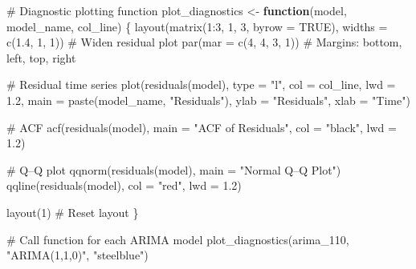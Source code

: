\documentclass[
  11pt,
]{article}
\newenvironment{Shaded}{\begin{snugshade}}{\end{snugshade}}
\newcommand{\AttributeTok}[1]{\textcolor[rgb]{0.40,0.45,0.13}{#1}}
\newcommand{\CommentTok}[1]{\textcolor[rgb]{0.37,0.37,0.37}{#1}}
\newcommand{\ConstantTok}[1]{\textcolor[rgb]{0.56,0.35,0.01}{#1}}
\newcommand{\ControlFlowTok}[1]{\textcolor[rgb]{0.00,0.23,0.31}{\textbf{#1}}}
\newcommand{\DecValTok}[1]{\textcolor[rgb]{0.68,0.00,0.00}{#1}}
\newcommand{\FloatTok}[1]{\textcolor[rgb]{0.68,0.00,0.00}{#1}}
\newcommand{\FunctionTok}[1]{\textcolor[rgb]{0.28,0.35,0.67}{#1}}
\newcommand{\NormalTok}[1]{\textcolor[rgb]{0.00,0.23,0.31}{#1}}
\newcommand{\OtherTok}[1]{\textcolor[rgb]{0.00,0.23,0.31}{#1}}
\newcommand{\SpecialCharTok}[1]{\textcolor[rgb]{0.37,0.37,0.37}{#1}}
\newcommand{\StringTok}[1]{\textcolor[rgb]{0.13,0.47,0.30}{#1}}
\begin{document}
\begin{Shaded}
\begin{Highlighting}[]
\CommentTok{\# Diagnostic plotting function}
\NormalTok{plot\_diagnostics }\OtherTok{\textless{}{-}} \ControlFlowTok{function}\NormalTok{(model, model\_name, col\_line) \{}
  \FunctionTok{layout}\NormalTok{(}\FunctionTok{matrix}\NormalTok{(}\DecValTok{1}\SpecialCharTok{:}\DecValTok{3}\NormalTok{, }\DecValTok{1}\NormalTok{, }\DecValTok{3}\NormalTok{, }\AttributeTok{byrow =} \ConstantTok{TRUE}\NormalTok{), }\AttributeTok{widths =} \FunctionTok{c}\NormalTok{(}\FloatTok{1.4}\NormalTok{, }\DecValTok{1}\NormalTok{, }\DecValTok{1}\NormalTok{))  }\CommentTok{\# Widen residual plot}
  \FunctionTok{par}\NormalTok{(}\AttributeTok{mar =} \FunctionTok{c}\NormalTok{(}\DecValTok{4}\NormalTok{, }\DecValTok{4}\NormalTok{, }\DecValTok{3}\NormalTok{, }\DecValTok{1}\NormalTok{))  }\CommentTok{\# Margins: bottom, left, top, right}
  
  \CommentTok{\# Residual time series}
  \FunctionTok{plot}\NormalTok{(}\FunctionTok{residuals}\NormalTok{(model), }\AttributeTok{type =} \StringTok{"l"}\NormalTok{, }\AttributeTok{col =}\NormalTok{ col\_line, }\AttributeTok{lwd =} \FloatTok{1.2}\NormalTok{,}
       \AttributeTok{main =} \FunctionTok{paste}\NormalTok{(model\_name, }\StringTok{"Residuals"}\NormalTok{), }\AttributeTok{ylab =} \StringTok{"Residuals"}\NormalTok{, }\AttributeTok{xlab =} \StringTok{"Time"}\NormalTok{)}
  
  \CommentTok{\# ACF}
  \FunctionTok{acf}\NormalTok{(}\FunctionTok{residuals}\NormalTok{(model), }\AttributeTok{main =} \StringTok{"ACF of Residuals"}\NormalTok{, }\AttributeTok{col =} \StringTok{"black"}\NormalTok{, }\AttributeTok{lwd =} \FloatTok{1.2}\NormalTok{)}
  
  \CommentTok{\# Q–Q plot}
  \FunctionTok{qqnorm}\NormalTok{(}\FunctionTok{residuals}\NormalTok{(model), }\AttributeTok{main =} \StringTok{"Normal Q–Q Plot"}\NormalTok{)}
  \FunctionTok{qqline}\NormalTok{(}\FunctionTok{residuals}\NormalTok{(model), }\AttributeTok{col =} \StringTok{"red"}\NormalTok{, }\AttributeTok{lwd =} \FloatTok{1.2}\NormalTok{)}
  
  \FunctionTok{layout}\NormalTok{(}\DecValTok{1}\NormalTok{)  }\CommentTok{\# Reset layout}
\NormalTok{\}}

\CommentTok{\# Call function for each ARIMA model}
\FunctionTok{plot\_diagnostics}\NormalTok{(arima\_110, }\StringTok{"ARIMA(1,1,0)"}\NormalTok{, }\StringTok{"steelblue"}\NormalTok{)}
\end{Highlighting}
\end{Shaded}
\end{document}
